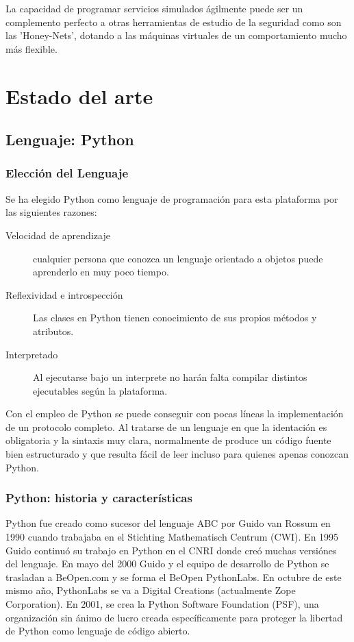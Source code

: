 \documentclass[a4paper,spanish,12pt]{book}
\begin{document}
La capacidad de programar servicios simulados ágilmente puede ser un complemento perfecto a otras herramientas de estudio de la seguridad como son las 'Honey-Nets', dotando a las m\'aquinas virtuales de un comportamiento mucho m\'as flexible.



\chapter{Estado del arte}

\section{Lenguaje: Python}
\subsection{Elecci\'on del Lenguaje} 
Se ha elegido Python como lenguaje de programaci\'on para esta plataforma por las siguientes razones:
\begin{description}
	\item[Velocidad de aprendizaje] cualquier persona que conozca un lenguaje orientado a objetos puede aprenderlo en muy poco tiempo.
	\item[Reflexividad e introspección] Las clases en Python tienen conocimiento de sus propios m\'etodos y atributos.
	\item[Interpretado] Al ejecutarse bajo un interprete no har\'an falta compilar distintos ejecutables seg\'un la plataforma.
\end{description}

Con el empleo de Python se puede conseguir con pocas líneas la implementaci\'on de un protocolo completo. Al tratarse de un lenguaje en que la identaci\'on es obligatoria y la sintaxis muy clara, normalmente de produce un código fuente bien estructurado y que resulta fácil de leer incluso para quienes apenas conozcan Python.

\subsection{Python: historia y características}

Python fue creado como sucesor del lenguaje ABC por Guido van Rossum en 1990 cuando trabajaba en el Stichting Mathematisch Centrum (CWI). En 1995 Guido continuó su trabajo en Python en el CNRI donde creó muchas versiónes del lenguaje. En mayo del 2000 Guido y el equipo de desarrollo de Python se trasladan a BeOpen.com y se forma el BeOpen PythonLabs. En octubre de este mismo año, PythonLabs se va a Digital Creations (actualmente Zope Corporation). En 2001, se crea la Python Software Foundation (PSF), una organización sin ánimo de lucro creada específicamente para proteger la libertad de Python como lenguaje de código abierto.
\end{document}
